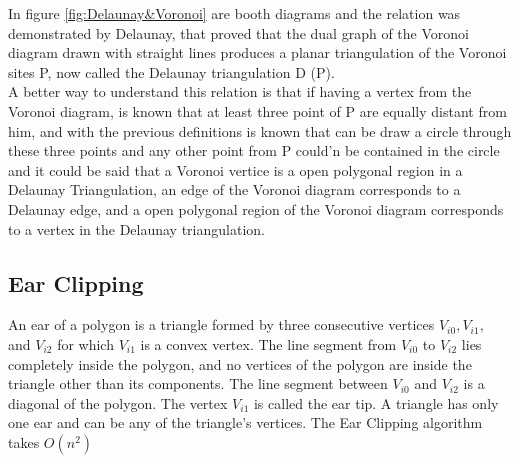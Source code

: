\documentclass[conference]{IEEEtran}
\begin{document}
In figure \ref{fig:Delaunay&Voronoi} are booth diagrams and the relation was demonstrated by Delaunay, that proved that the dual graph of the Voronoi diagram drawn with straight lines produces a planar triangulation of the Voronoi sites P, now called the Delaunay triangulation D (P).\cite{DelaunayTriangulation}\\
A better way to understand this relation is that if having a vertex from the Voronoi diagram, is known that at least three point of P are equally distant from him, and with the previous definitions is known that can be draw a circle through these three points and any other point from P could'n be contained in the circle and it could be said that a Voronoi vertice is a open polygonal region in a Delaunay Triangulation, an edge of the Voronoi diagram corresponds to a Delaunay edge, and a open polygonal region of the Voronoi diagram corresponds to a vertex in the Delaunay triangulation.\cite{TriangulationsUnknown}
    
\subsection{Ear Clipping}
An ear of a polygon is a triangle formed by three consecutive vertices $V_{i0},V_{i1},$ and $V_{i2}$ for which $V_{i1}$ is a convex vertex. The line segment from $V_{i0}$ to $V_{i2}$ lies completely inside the polygon, and no vertices of the polygon are inside the triangle other than its components. The line segment between $V_{i0}$ and $V_{i2}$ is a diagonal of the polygon. The vertex $V_{i1}$ is called the ear tip. A triangle has only one ear and can be any of the triangle's vertices. The Ear Clipping algorithm takes $O(n^2)$\cite{EarClipping}
\end{document}
